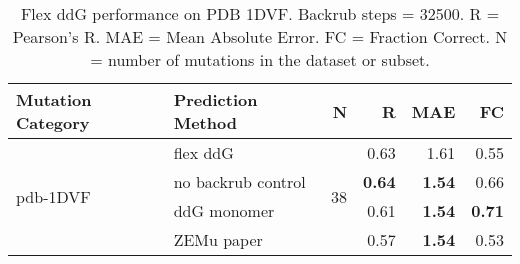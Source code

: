 \begin{table}
  \begin{tabular}{llrrrr}
\toprule
Mutation Category &   Prediction Method &   N &    R &  MAE &   FC \\
\midrule
 \multirow{ 4}{*}{pdb-1DVF} & flex ddG & \multirow{ 4}{*}{38} & 0.63 & 1.61 & 0.55  \\
 & no backrub control & & \textbf{0.64} & \textbf{1.54} & 0.66  \\
 & ddG monomer & & 0.61 & \textbf{1.54} & \textbf{0.71}  \\
 & ZEMu paper & & 0.57 & \textbf{1.54} & 0.53  \\
\bottomrule
\end{tabular}
  \caption[Flex ddG performance on PDB 1DVF]{
    Flex ddG performance on PDB 1DVF. Backrub steps = 32500. R = Pearson's R. MAE = Mean Absolute Error. FC = Fraction Correct. N = number of mutations in the dataset or subset.
  } \label{tab:table-pdb-1DVF}
\end{table}
